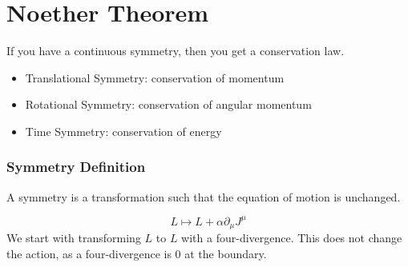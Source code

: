 \documentclass[]{scrartcl}
\begin{document}
\section{Noether Theorem}

If you have a continuous symmetry, then you get a conservation law.
\begin{itemize}
	\item Translational Symmetry: conservation of momentum
	\item Rotational Symmetry: conservation of angular momentum
	\item Time Symmetry: conservation of energy
\end{itemize}

\subsubsection{Symmetry Definition}
A symmetry is a transformation such that the equation of motion is unchanged.

\begin{equation}
	L \mapsto L + \alpha \partial_\mu J^\mu
\end{equation}
We start with transforming $L$ to $L$ with a four-divergence. This does not change the action, as a four-divergence is 0 at the boundary.
\end{document}
